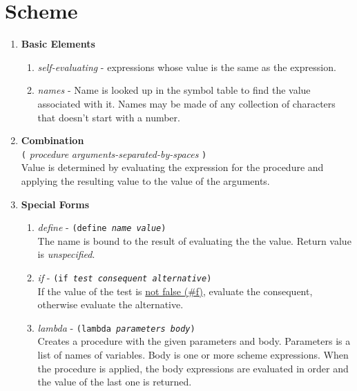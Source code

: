 


\section*{Scheme}
\begin{enumerate}
\item {\bf Basic Elements}
  \begin{enumerate}
  \item {\it self-evaluating} - expressions whose value is the same as
    the expression.
    \vspace{.5in}
  \item {\it names} - Name is looked up in the symbol table to find
    the value associated with it.  Names may be made of any collection
    of characters that doesn't start with a number.
    \vspace{.5in}
  \end{enumerate}
\item {\bf Combination}\\
  {\tt (} {\it procedure} {\it arguments-separated-by-spaces} {\tt )}\\
  Value is determined by evaluating the expression for the procedure
  and applying the resulting value to the value of the arguments.
  \vspace{.5in}

\item {\bf Special Forms}
  \begin{enumerate}
  \item {\large {\it define}} - {\tt (define {\it name value})}\\ The
    name is bound to the result of evaluating the the value.  Return
    value is {\it unspecified}.
    \vspace{.5in}
  \item {\large {\it if}} - {\tt (if {\it test consequent alternative})}\\ If
    the value of the test is \underline{not false (\#f)}, evaluate the
    consequent, otherwise evaluate the alternative.
    \vspace{.5in}
  \item {\large {\it lambda}} - {\tt (lambda {\it parameters body})}\\ Creates
    a procedure with the given parameters and body.  Parameters is a
    list of names of variables.  Body is one or more scheme
    expressions.  When the procedure is applied, the body expressions
    are evaluated in order and the value of the last one is returned.
    \vspace{.5in}
  \end{enumerate}
\end{enumerate}

